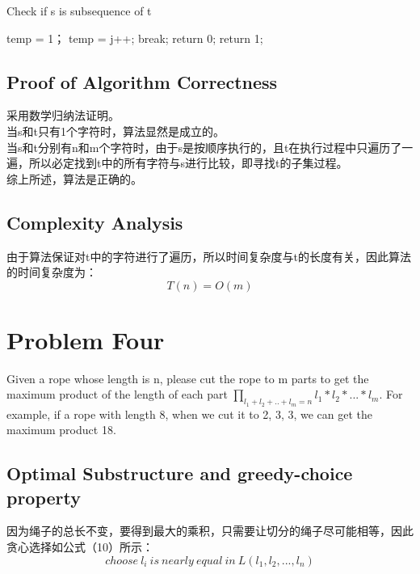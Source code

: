 \documentclass{article}
\begin{document}
\begin{algorithm}[htbp]  
  \caption{Check if s is subsequence of t}  
  \begin{algorithmic}[1] 
	\State temp = 1；
	\State temp = j++;
	\State break;
	\EndIf
	\State return 0;
	\EndFor
	\EndFor
	\State return 1;
    \EndFunction 
  \end{algorithmic}  
\end{algorithm} 

\subsection{Proof of Algorithm Correctness}
采用数学归纳法证明。\\

当s和t只有1个字符时，算法显然是成立的。\\

当s和t分别有n和m个字符时，由于s是按顺序执行的，且t在执行过程中只遍历了一遍，所以必定找到t中的所有字符与s进行比较，即寻找t的子集过程。\\

综上所述，算法是正确的。


\subsection{Complexity Analysis}
由于算法保证对t中的字符进行了遍历，所以时间复杂度与t的长度有关，因此算法的时间复杂度为：
\begin{equation}
T(n)= O(m)
\end{equation} 


\newpage
\section{Problem Four}
Given a rope whose length is n, please cut the rope to m parts to get the maximum product of the length of each part $\prod_{l_1+l_2+..+l_m=n} l_1 \ast l_2 \ast ... \ast l_m$. For example, if a rope with length 8, when we cut it to 2, 3, 3, we can get the maximum product 18.


\subsection{Optimal Substructure and greedy-choice property}
因为绳子的总长不变，要得到最大的乘积，只需要让切分的绳子尽可能相等，因此贪心选择如公式（10）所示：
\begin{equation}
choose\ l_i\ is\ nearly\ equal\ in\ L(l_1,l_2,...,l_n)
\end{equation} 
\end{document}

